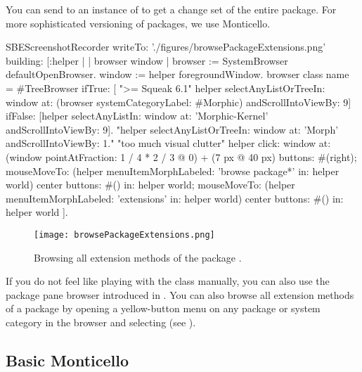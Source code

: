 \documentclass[a4paper,10pt,twoside]{book}
\begin{document}

You can send  to an instance of  to get a change set of the entire package.
For more sophisticated versioning of packages, we use Monticello.

\begin{ExecuteSmalltalkScript}
SBEScreenshotRecorder writeTo: './figures/browsePackageExtensions.png' building: [:helper |
	| browser window |
	browser := SystemBrowser defaultOpenBrowser.
	window := helper foregroundWindow.
	browser class name = #TreeBrowser
		ifTrue: [ ">= Squeak 6.1"
			helper selectAnyListOrTreeIn: window at: (browser systemCategoryLabel: #Morphic) andScrollIntoViewBy: 9]
		ifFalse:
			[helper selectAnyListIn: window at: 'Morphic-Kernel' andScrollIntoViewBy: 9].
	"helper selectAnyListOrTreeIn: window at: 'Morph' andScrollIntoViewBy: 1." "too much visual clutter"
	helper
		click: window at: (window pointAtFraction: 1 / 4 * 2 / 3 @ 0) + (7 px @ 40 px) buttons: #(right);
		mouseMoveTo: (helper menuItemMorphLabeled: 'browse package*' in: helper world) center buttons: #() in: helper world;
		mouseMoveTo: (helper menuItemMorphLabeled: 'extensions' in: helper world) center buttons: #() in: helper world
].
\end{ExecuteSmalltalkScript}
\begin{figure}
	\begin{center}
		\texttt{[image: browsePackageExtensions.png]}
	\end{center}
	\caption{Browsing all extension methods of the package .}
	\label{fig:browsePackageExtensions}
\end{figure}

If you do not feel like playing with the  class manually, you can also use the package pane browser introduced in .
You can also browse all extension methods of a package by opening a yellow-button menu on any package or system category in the browser and selecting  (see ).

\subsection{Basic Monticello}
\end{document}
